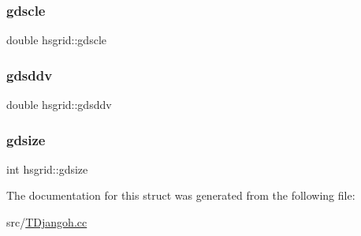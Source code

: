\subsubsection{\texorpdfstring{gdscle}{gdscle}}
{\footnotesize\ttfamily double hsgrid\+::gdscle}

\mbox{\label{structhsgrid_abf3eb94d02a77782b99c47c7df417f3e}} 
\subsubsection{\texorpdfstring{gdsddv}{gdsddv}}
{\footnotesize\ttfamily double hsgrid\+::gdsddv}

\mbox{\label{structhsgrid_a4b5c589981c90e31408c873854b73746}} 
\subsubsection{\texorpdfstring{gdsize}{gdsize}}
{\footnotesize\ttfamily int hsgrid\+::gdsize}



The documentation for this struct was generated from the following file\+:\begin{DoxyCompactItemize}
\item 
src/\hyperlink{_t_djangoh_8cc}{T\+Djangoh.\+cc}\end{DoxyCompactItemize}
